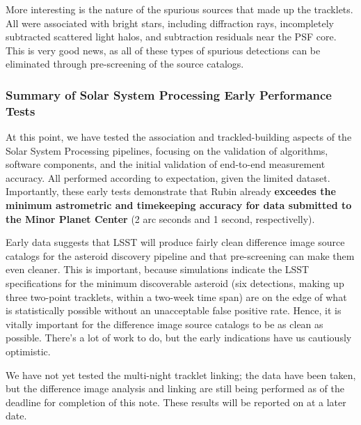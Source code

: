 More interesting is the nature of the spurious sources that made up the tracklets. All were associated with bright stars, including diffraction rays, incompletely subtracted scattered light halos, and subtraction residuals near the PSF core. This is very good news, as all of these types of spurious detections can be eliminated through pre-screening of the source catalogs. 

\subsubsection{Summary of Solar System Processing Early Performance Tests}

At this point, we have tested the association and trackled-building aspects of the Solar System Processing pipelines, focusing on the validation of algorithms, software components, and the initial validation of end-to-end measurement accuracy. All performed according to expectation, given the limited dataset. Importantly, these early tests demonstrate that Rubin already {\bf exceedes the minimum astrometric and timekeeping accuracy for data submitted to the Minor Planet Center} (2 arc seconds and 1 second, respectivelly).

Early data suggests that LSST will produce fairly clean difference image source catalogs for the asteroid discovery pipeline and that pre-screening can make them even cleaner. This is important, because simulations indicate the LSST specifications for the minimum discoverable asteroid (six detections, making up three two-point tracklets, within a two-week time span) are on the edge of what is statistically possible without an unacceptable false positive rate. Hence, it is vitally important for the difference image source catalogs to be as clean as possible. There's a lot of work to do, but the early indications have us cautiously optimistic.

We have not yet tested the multi-night tracklet linking; the data have been taken, but the difference image analysis and linking are still being performed as of the deadline for completion of this note. These results will be reported on at a later date.
